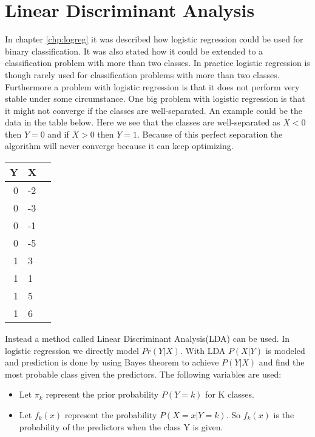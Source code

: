 \chapter{Linear Discriminant Analysis}
\label{chp:lindisana}

In chapter \ref{chp:logreg} it was described how logistic regression could be used for binary classification. It was also stated how it could be extended to  a classification problem with more than two classes. In practice logistic regression is though rarely used for classification problems with more than two classes. Furthermore a problem with logistic regression is that it does not perform very stable under some circumstance. One big problem with logistic regression is that it might not converge if the classes are well-separated. An example could be the data in the table below. Here we see that the classes are well-separated as $X<0$ then $Y=0$ and if $X>0$ then $Y=1$. Because of this perfect separation the algorithm will never converge because it can keep optimizing.
\begin{center} 
	\begin{tabular}{rll}
		\multicolumn{1}{c}{\textbf{Y}} &
		\multicolumn{1}{c}{\textbf{X}} \\ \hline
		0     &  -2  \\[0.05cm] 
		0     &  -3  \\[0.05cm] 
		0     &  -1  \\[0.05cm] 
		0     &  -5  \\[0.05cm] 
		1     &    3  \\[0.05cm] 
		1     &    1  \\[0.05cm] 
		1     &    5  \\[0.05cm] 
		1     &    6  \\[0.05cm] 
	\end{tabular}
\end{center}

Instead a method called Linear Discriminant Analysis(LDA) can be used. In logistic regression we directly model $Pr(Y|X)$. With LDA $P(X|Y)$ is modeled and prediction is done by using Bayes theorem to achieve $P(Y|X)$ and find the most probable class given the predictors. The following variables are used:

\begin{itemize}
	\item Let $\pi_k$ represent the prior probability $P(Y=k)$ for K classes.
	\item Let $f_k(x)$ represent the probability $P(X=x|Y=k)$. So $f_k(x)$ is the probability of the predictors when the class Y is given.
\end{itemize} 

